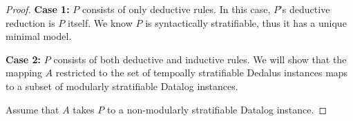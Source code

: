 \begin{proof}
%
{\bf Case 1:} $P$ consists of only deductive rules.  In this case, $P$'s
deductive reduction is $P$ itself.  We know $P$ is syntactically stratifiable,
thus it has a unique minimal model.

{\bf Case 2:} $P$ consists of both deductive and inductive rules.  We will show
that the mapping $A$ restricted to the set of tempoally stratifiable Dedalus
instances maps to a subset of modularly stratifiable Datalog instances.

Assume that $A$ takes $P$ to a non-modularly stratifiable Datalog instance.
%
\end{proof}


